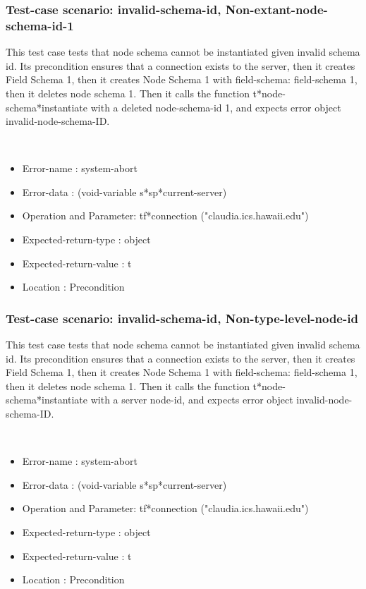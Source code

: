 \subsubsection {Test-case scenario: invalid-schema-id, Non-extant-node-schema-id-1}


This test case tests that node schema cannot be instantiated given invalid schema id.
Its precondition ensures that a connection exists to the server, then it creates Field Schema 1, then it creates Node Schema 1 with field-schema: field-schema 1, then it deletes node schema 1.
Then it calls the function t*node-schema*instantiate  with a deleted node-schema-id 1, and expects error object invalid-node-schema-ID.



\
\begin {itemize}
\item 	Error-name             : system-abort
\item Error-data             : (void-variable s*sp*current-server)
\item Operation and Parameter: tf*connection ("claudia.ics.hawaii.edu")
\item Expected-return-type   : object
\item Expected-return-value  : t
\item Location               : Precondition



\end {itemize}
\subsubsection {Test-case scenario: invalid-schema-id, Non-type-level-node-id}


This test case tests that node schema cannot be instantiated given invalid schema id.
Its precondition ensures that a connection exists to the server, then it creates Field Schema 1, then it creates Node Schema 1 with field-schema: field-schema 1, then it deletes node schema 1.
Then it calls the function t*node-schema*instantiate  with a server node-id, and expects error object invalid-node-schema-ID.



\
\begin {itemize}
\item 	Error-name             : system-abort
\item Error-data             : (void-variable s*sp*current-server)
\item Operation and Parameter: tf*connection ("claudia.ics.hawaii.edu")
\item Expected-return-type   : object
\item Expected-return-value  : t
\item Location               : Precondition



\end {itemize}
